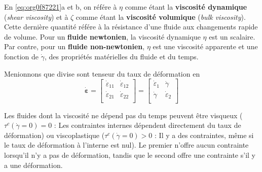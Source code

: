 \documentclass[10pt]{article}
\numberwithin{equation}{section}
\begin{document}
En \ref{eq:org0f87221}a et b, on référe à \(\eta\) comme étant la \textbf{viscosité dynamique} (\emph{shear viscosity}) et à \(\zeta\) comme étant la \textbf{viscosité volumique} (\emph{bulk viscosity}).
Cette dernière quantité référe à la résistance d'une fluide aux changements rapide de volume.
Pour un \textbf{fluide newtonien}, la viscosité dynamique \(\eta\) est un scalaire.
Par contre, pour un \textbf{fluide non-newtonien}, \(\eta\) est une viscosité apparente et une fonction de \(\dot{\gamma}\), des propriétés matérielles du fluide et du temps.

Menionnons que \Textcite{herman2022granular} divise sont tenseur du taux de déformation en
\begin{equation}
   \dot{\boldsymbol{\varepsilon}} = \begin{bmatrix}
     \dot{\varepsilon}_{11} & \dot{\varepsilon}_{12}\\
     \dot{\varepsilon}_{21} & \dot{\varepsilon}_{22} \\
   \end{bmatrix} =\begin{bmatrix}
     \dot{\varepsilon}_1 & \dot{\gamma} \\
     \dot{\gamma} & \dot{\varepsilon}_2 \\
   \end{bmatrix}
\end{equation}

Les fluides dont la viscosité ne dépend pas du temps peuvent être visqueux (\(\tau^c(\dot{\gamma} = 0) = 0\)  : Les contraintes internes dépendent directement du taux de déformation) ou viscoplastique (\(\tau^c(\dot{\gamma} = 0) > 0\) : Il y a des contraintes, même si le taux de déformation à l'interne est nul).
Le premier n'offre aucun contrainte lorsqu'il n'y a pas de déformation, tandis que le second offre une contrainte s'il y a une déformation. 

\printbibliography
\end{document}
